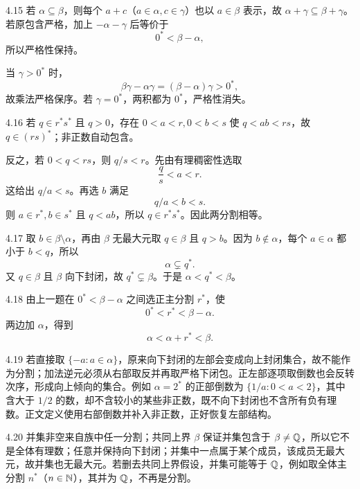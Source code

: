 \begin{solution}{4.15}
若 \(\alpha\subseteq\beta\)，则每个 \(a+c\)（\(a\in\alpha,c\in\gamma\)）也以 \(a\in\beta\) 表示，故 \(\alpha+\gamma\subseteq\beta+\gamma\)。若原包含严格，加上 \(-\alpha-\gamma\) 后等价于
\[
 0^*<\beta-\alpha,
\]
所以严格性保持。

当 \(\gamma>0^*\) 时，
\[
 \beta\gamma-\alpha\gamma=(\beta-\alpha)\gamma>0^*,
\]
故乘法严格保序。若 \(\gamma=0^*\)，两积都为 \(0^*\)，严格性消失。
\end{solution}

\begin{solution}{4.16}
若 \(q\in r^*s^*\) 且 \(q>0\)，存在 \(0<a<r,0<b<s\) 使 \(q<ab<rs\)，故 \(q\in(rs)^*\)；非正数自动包含。

反之，若 \(0<q<rs\)，则 \(q/s<r\)。先由有理稠密性选取
\[
  \frac qs<a<r.
\]
这给出 \(q/a<s\)。再选 \(b\) 满足
\[
 q/a<b<s.
\]
则 \(a\in r^*,b\in s^*\) 且 \(q<ab\)，所以 \(q\in r^*s^*\)。因此两分割相等。
\end{solution}

\begin{solution}{4.17}
取 \(b\in\beta\setminus\alpha\)，再由 \(\beta\) 无最大元取 \(q\in\beta\) 且 \(q>b\)。因为 \(b\notin\alpha\)，每个 \(a\in\alpha\) 都小于 \(b<q\)，所以
\[
 \alpha\subsetneq q^*.
\]
又 \(q\in\beta\) 且 \(\beta\) 向下封闭，故 \(q^*\subsetneq\beta\)。于是 \(\alpha<q^*<\beta\)。
\end{solution}

\begin{solution}{4.18}
由上一题在 \(0^*<\beta-\alpha\) 之间选正主分割 \(r^*\)，使
\[
 0^*<r^*<\beta-\alpha.
\]
两边加 \(\alpha\)，得到
\[
 \alpha<\alpha+r^*<\beta.
\]
\end{solution}

\begin{solution}{4.19}
若直接取 \(\{-a:a\in\alpha\}\)，原来向下封闭的左部会变成向上封闭集合，故不能作为分割；加法逆元必须从右部取反并再取严格下闭包。正左部逐项取倒数也会反转次序，形成向上倾向的集合。例如 \(\alpha=2^*\) 的正部倒数为 \(\{1/a:0<a<2\}\)，其中含大于 \(1/2\) 的数，却不含较小的某些非正数，既不向下封闭也不含所有负有理数。正文定义使用右部倒数并补入非正数，正好恢复左部结构。
\end{solution}

\begin{solution}{4.20}
并集非空来自族中任一分割；共同上界 \(\beta\) 保证并集包含于 \(\beta\ne\mathbb{Q}\)，所以它不是全体有理数；任意并保持向下封闭；并集中一点属于某个成员，该成员无最大元，故并集也无最大元。若删去共同上界假设，并集可能等于 \(\mathbb{Q}\)，例如取全体主分割 \(n^*\)（\(n\in\mathbb{N}\)），其并为 \(\mathbb{Q}\)，不再是分割。
\end{solution}

